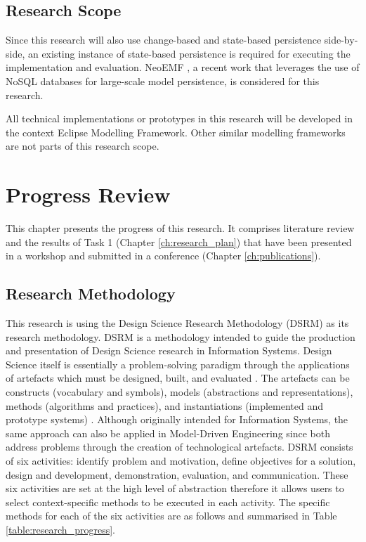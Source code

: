 \documentclass[12pt, a4paper]{report} \usepackage[titletoc]{appendix}
\begin{document}
\section{Research Scope}
\label{sec:research_scope}
Since this research will also use change-based and state-based persistence side-by-side, an existing instance of state-based persistence is required for executing the implementation and evaluation. NeoEMF \cite{daniel2016neoemf}, a recent work that leverages the use of NoSQL databases for large-scale model persistence, is considered for this research. 

All technical implementations or prototypes in this research will be developed in the context Eclipse Modelling Framework. Other similar modelling frameworks are not parts of this research scope. 


\chapter{Progress Review}
\label{ch:progress_review}
This chapter presents the progress of this research. It comprises literature review and the results of Task 1 (Chapter \ref{ch:research_plan}) that have been presented in a workshop and submitted in a conference (Chapter \ref{ch:publications}). 

\section{Research Methodology}
\label{sec:research_methodology}
This research is using the Design Science Research Methodology (DSRM) \cite{peffers2007design} as its research methodology. DSRM is a methodology intended to guide the production and presentation of Design Science research in Information Systems. Design Science itself is essentially a problem-solving paradigm through the applications of artefacts which must be designed, built, and evaluated \cite{hevner2010design}. The artefacts can be constructs (vocabulary and symbols), models (abstractions and representations), methods (algorithms and practices), and instantiations (implemented and prototype systems) \cite{hevner2004design}. Although originally intended for Information Systems, the same approach can also be applied in Model-Driven Engineering since both address problems through the creation of technological artefacts. DSRM consists of six activities: identify problem and motivation, define objectives for a solution, design and development, demonstration, evaluation, and communication. These six activities are set at the high level of abstraction therefore it allows users to select context-specific methods to be executed in each activity. The specific methods for each of the six activities are as follows and summarised in Table \ref{table:research_progress}.
\end{document}
